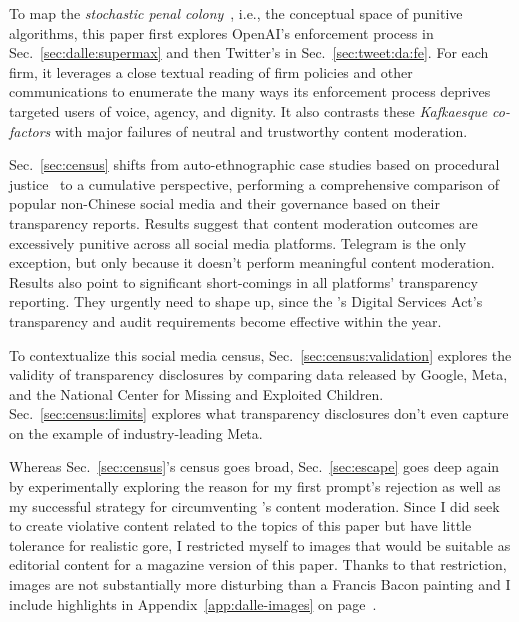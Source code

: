 To map the \emph{stochastic penal colony}~, i.e., the
conceptual space of punitive algorithms, this paper first explores OpenAI's
enforcement process in Sec.~\ref{sec:dalle:supermax} and then Twitter's in
Sec.~\ref{sec:tweet:da:fe}. For each firm, it leverages a close textual reading
of firm policies and other communications to enumerate the many ways its
enforcement process deprives targeted users of voice, agency, and dignity. It
also contrasts these \emph{Kafkaesque co-factors} with major failures of neutral
and trustworthy content moderation.

Sec.~\ref{sec:census} shifts from auto-ethnographic case studies based on
procedural justice~\cite{Tyler2003,Tyler2006,Tyler2007} to a cumulative
perspective, performing a comprehensive comparison of popular non-Chinese social
media and their governance based on their transparency reports. Results suggest
that content moderation outcomes are excessively punitive across all social
media platforms. Telegram is the only exception, but only because it doesn't
perform meaningful content moderation. Results also point to significant
short-comings in all platforms' transparency reporting. They urgently need to
shape up, since the \EU's Digital Services Act's transparency and audit
requirements become effective within the year.

To contextualize this social media census, Sec.\ \ref{sec:census:validation}
explores the validity of transparency disclosures by comparing data released by
Google, Meta, and the National Center for Missing and Exploited Children.
Sec.~\ref{sec:census:limits} explores what transparency disclosures don't even
capture on the example of industry-leading Meta.

Whereas Sec.~\ref{sec:census}'s census goes broad, Sec.~\ref{sec:escape} goes
deep again by experimentally exploring the reason for my first prompt's
rejection as well as my successful strategy for circumventing \DALLE's content
moderation. Since I did seek to create violative content related to the topics
of this paper but have little tolerance for realistic gore, I restricted myself
to images that would be suitable as editorial content for a magazine version of
this paper. Thanks to that restriction, images are not substantially more
disturbing than a Francis Bacon painting and I include highlights in
Appendix~\ref{app:dalle-images} on
page~\pageref{app:dalle-images}.

